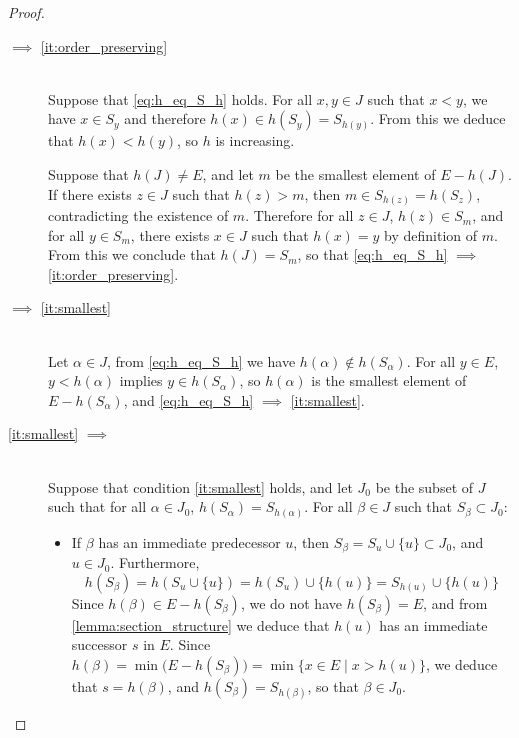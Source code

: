 \documentclass[11pt,a4paper,twoside]{article}
\makeatletter
\theoremstyle{definition}
\def\btagform@#1{\maketag@@@{\textbf{(\ignorespaces#1\unskip\@@italiccorr)}}}
\newcommand{\beqref}[1]{\textup{\btagform@{\ref{#1}}}}
\makeatother
\begin{document}
\begin{proof}
\begin{enumerate}[(a)]
\begin{description}
    \item [\beqref{eq:h_eq_S_h} $\bm{\implies}$ \ref{it:order_preserving}]~\\
      Suppose that \eqref{eq:h_eq_S_h} holds. For all $x, y \in J$ such that $x < y$, we have $x \in S_y$ and therefore
      $h ( x ) \in h ( S_y ) = S_{ h ( y ) }$. From this we deduce that $h ( x ) < h ( y )$, so $h$ is increasing.

      Suppose that $h ( J ) \neq E$, and let $m$ be the smallest element of $E - h ( J )$. If there exists $z \in J$ such that
      $h ( z ) > m$, then $m \in S_{ h ( z ) } = h ( S_z )$, contradicting the existence of $m$. Therefore for all $z \in J$,
      $h ( z ) \in S_m$, and for all $y \in S_m$, there exists $x \in J$ such that $h ( x ) = y$ by definition of $m$.
      From this we conclude that $h ( J ) = S_m$, so that \eqref{eq:h_eq_S_h} $\implies$ \ref{it:order_preserving}.

    \item [\beqref{eq:h_eq_S_h} $\bm{\implies}$ \ref{it:smallest}]~\\
      Let $\alpha \in J$, from \eqref{eq:h_eq_S_h} we have $h ( \alpha ) \notin h ( S_\alpha )$. For all $y \in E$,
      $y < h ( \alpha )$ implies $y \in h ( S_\alpha )$, so $h ( \alpha )$ is the smallest element of $E - h ( S_\alpha )$,
      and \eqref{eq:h_eq_S_h} $\implies$ \ref{it:smallest}.

    \item [\ref{it:smallest} $\bm{\implies}$ \beqref{eq:h_eq_S_h}]~\\
      Suppose that condition \ref{it:smallest} holds, and let $J_0$ be the subset of $J$ such that for all $\alpha \in J_0$,
      $h ( S_\alpha ) = S_{ h ( \alpha ) }$. For all $\beta \in J$ such that $S_\beta \subset J_0$:
      \begin{itemize}

      \item If $\beta$ has an immediate predecessor $u$, then $S_\beta = S_u \cup \{ u \} \subset J_0$, and $u \in J_0$.
        Furthermore,
        \begin{equation*}
          h ( S_\beta ) = h ( S_u \cup \{ u \} ) = h ( S_u ) \cup \{ h ( u ) \} = S_{ h ( u ) } \cup \{ h ( u ) \}
        \end{equation*}
        Since $h ( \beta ) \in E - h ( S_\beta )$, we do not have $h ( S_\beta ) = E$, and from \cref{lemma:section_structure}
        we deduce that $h ( u )$ has an immediate successor $s$ in $E$. Since
        $h ( \beta ) = \min \big( E - h ( S_\beta ) \big) = \min \{ x \in E \mid x > h ( u ) \}$,
        we deduce that $s = h ( \beta )$, and $h ( S_\beta ) = S_{ h ( \beta ) }$, so that $\beta \in J_0$.


\end{itemize}
\end{description}
\end{enumerate}
\end{proof}
\end{document}
